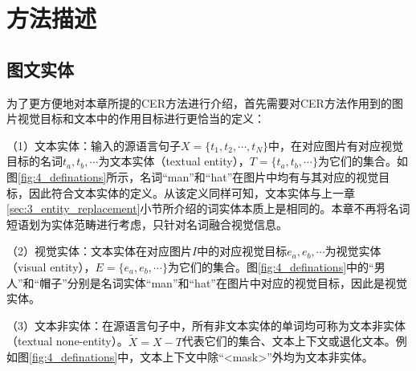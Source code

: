 \section{方法描述}

\subsection{图文实体}
\label{sec:4_entities}

为了更方便地对本章所提的CER方法进行介绍，首先需要对CER方法作用到的图片视觉目标和文本中的作用目标进行更恰当的定义：

（1）{\sffamily 文本实体：}输入的源语言句子$X=\{t_1,t_2,\cdots,t_N\}$中，在对应图片有对应视觉目标的名词$t_a,t_b,\cdots$为文本实体（textual entity），$T=\{t_a,t_b,\cdots\}$为它们的集合。如图\ref{fig:4_definations}所示，名词“man”和“hat”在图片中均有与其对应的视觉目标，因此符合文本实体的定义。从该定义同样可知，文本实体与上一章\ref{sec:3_entity_replacement}小节所介绍的词实体本质上是相同的。本章不再将名词短语划为实体范畴进行考虑，只针对名词融合视觉信息。

（2）{\sffamily 视觉实体：}文本实体在对应图片$I$中的对应视觉目标${e_a,e_b,\cdots}$为视觉实体（visual entity），$E=\{e_a,e_b,\cdots\}$为它们的集合。图\ref{fig:4_definations}中的“男人”和“帽子”分别是名词实体“man”和“hat”在图片中对应的视觉目标，因此是视觉实体。

（3）{\sffamily 文本非实体：}在源语言句子中，所有非文本实体的单词均可称为文本非实体（textual none-entity）。$\tilde{X}=X-T$代表它们的集合、文本上下文或退化文本。例如图\ref{fig:4_definations}中，文本上下文中除“<mask>”外均为文本非实体。

%

%

